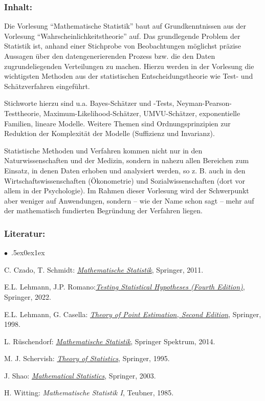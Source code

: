 \documentclass[a4paper,10pt]{article}
\renewenvironment{itemize}{\begin{list}{$\bullet$\ }{\itemsep.5ex\setlength{\topsep}{0.5\itemsep}\parsep0ex\labelsep1ex\settowidth{\labelwidth}{$\bullet$\ }\setlength{\leftmargin}{\labelwidth}\addtolength{\leftmargin}{3ex}\addtolength{\leftmargin}{\labelsep}}}{\end{list}}
\begin{document}
\subsubsection*{\large
    Inhalt:
}
Die Vorlesung "`Mathematische Statistik"' baut auf Grundkenntnissen aus der Vorlesung "`Wahrscheinlichkeitstheorie"' auf. 
Das grundlegende Problem der Statistik ist, anhand einer Stichprobe von Beobachtungen möglichst präzise Aussagen über den datengenerierenden
Prozess bzw. die den Daten zugrundeliegenden Verteilungen zu machen. Hierzu werden in der Vorlesung die wichtigsten Methoden aus der statistischen Entscheidungstheorie wie Test- und Schätzverfahren eingeführt.

Stichworte hierzu sind u.a. Bayes-Schätzer und -Tests, Neyman-Pearson-Testtheorie, Maximum-Likelihood-Schätzer, UMVU-Schätzer, exponentielle Familien, lineare Modelle. Weitere Themen sind Ordnungsprinzipien zur Reduktion der Komplexität der Modelle (Suffizienz und Invarianz).

Statistische Methoden und Verfahren kommen nicht nur in den Naturwissenschaften und der Medizin, sondern in nahezu allen Bereichen zum Einsatz, in denen Daten erhoben und analysiert werden, so z. B. auch in den Wirtschaftswissenschaften (Ökonometrie) und Sozialwissenschaften (dort vor allem in der Psychologie). Im Rahmen dieser Vorlesung wird der Schwerpunkt aber weniger auf Anwendungen, sondern – wie der Name schon sagt – mehr auf der mathematisch fundierten Begründung der Verfahren liegen.
\subsubsection*{\large
    Literatur:
}
\begin{itemize}
\item C. Czado, T. Schmidt: \href{https://link.springer.com/book/10.1007/978-3-642-17261-8}{\emph{Mathematische Statistik}}, Springer, 2011.
\item E.L. Lehmann, J.P. Romano:\href{https://link.springer.com/book/10.1007/978-3-030-70578-7}{\emph{Testing Statistical Hypotheses (Fourth Edition)}}, Springer, 2022.
\item E.L. Lehmann, G. Casella: \href{https://link.springer.com/book/10.1007/b98854}{\emph{Theory of Point Estimation, Second Edition}}, Springer, 1998. 
\item  L. Rüschendorf: \href{https://link.springer.com/book/10.1007/978-3-642-41997-3}{\emph{Mathematische Statistik}}, Springer Spektrum, 2014. 
\item  M. J. Schervish: \href{https://link.springer.com/book/10.1007/978-1-4612-4250-5}{\emph{Theory of Statistics}}, Springer, 1995.
\item J. Shao:  \href{https://link.springer.com/book/10.1007/b97553}{\emph{Mathematical Statistics}}, Springer, 2003.
\item H. Witting: \emph{Mathematische Statistik I}, Teubner, 1985.
\end{itemize}
\end{document}
